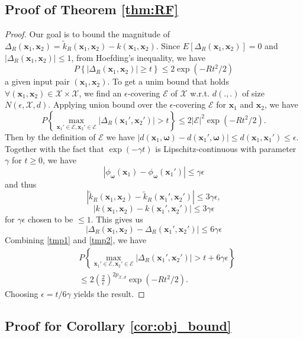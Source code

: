\documentclass{article}
\newcommand{\cE}{\mathcal{E}}
\newcommand{\X}{\mathcal{X}}
\newcommand{\1}{\mathbf{1}}
\newcommand{\bx}{\boldsymbol{x}}
\newcommand{\bomega}{\boldsymbol{\omega}}
\newcommand{\tk}{\tilde{k}}
\begin{document}
\subsection{Proof of Theorem \ref{thm:RF}}

\begin{proof}
Our goal is to bound the magnitude of $\Delta_R(\bx_1,\bx_2)=\tk_R(\bx_1,\bx_2)-k(\bx_1,\bx_2)$. Since $E[\Delta_R(\bx_1,\bx_2)]=0$ and $|\Delta_R(\bx_1,\bx_2)|\leq 1$, from Hoefding's inequality, we have
$$
P\left\{ |\Delta_R(\bx_1,\bx_2)|\geq t \right\} \leq 2 \exp(-Rt^2/2)
$$
 a given input pair $(\bx_1,\bx_2)$. To get a unim bound that holds  $\forall (\bx_1,\bx_2)\in\X\times\X$, we find an $\epsilon$-covering $\cE$ of $\X$ w.r.t. $d(.,.)$ of size $N(\epsilon,\X,d)$. Applying union bound over the $\epsilon$-covering $\cE$ for $\bx_1$ and $\bx_2$, we have
\begin{equation}\label{tmp1}
P\left\{ \max_{\bx_1'\in\cE,\bx_2'\in\cE} |\Delta_R(\bx_1',\bx_2')| > t \right\} \leq 2|\cE|^2\exp(-Rt^2/2).
\end{equation}
Then by the definition of $\cE$ we have $|d(\bx_1,\bomega)-d(\bx_1',\bomega)|\leq d(\bx_1,\bx_1')\leq \epsilon$. Together with the fact that $\exp(-\gamma t)$ is Lipschitz-continuous with parameter $\gamma$ for $t\geq0$, we have 
$$
|\phi_{\bomega}(\bx_1)-\phi_{\bomega}(\bx_1')|\leq \gamma\epsilon
$$
and thus
$$
|\tk_R(\bx_1,\bx_2)-\tk_R(\bx_1',\bx_2')|\leq 3\gamma\epsilon, 
$$
$$
|k(\bx_1,\bx_2)-k(\bx_1',\bx_2')|\leq 3\gamma\epsilon
$$
for $\gamma\epsilon$ chosen to be $\leq 1$. This gives us 
\begin{equation}\label{tmp2}
|\Delta_R(\bx_1,\bx_2)-\Delta_R(\bx_1',\bx_2')|\leq 6\gamma\epsilon
\end{equation}
Combining \eqref{tmp1} and \eqref{tmp2}, we have
\begin{equation}\label{tmp3}
\begin{aligned}
&P\left\{ \max_{\bx_1'\in\cE,\bx_2'\in\cE} |\Delta_R(\bx_1',\bx_2')| > t + 6\gamma \epsilon\right\} \\ 
&\leq 2\left(\frac{2}{\epsilon}\right)^{2p_{\X,d}}\exp(-Rt^2/2).
\end{aligned}
\end{equation}
Choosing $\epsilon=t/6\gamma$ yields the result.
\end{proof}

\subsection{Proof for Corollary \ref{cor:obj_bound}}
\end{document}
